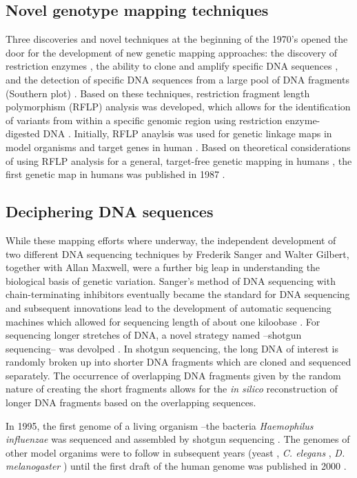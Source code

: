 \subsection{Novel genotype mapping techniques}
Three discoveries and novel techniques at the beginning of the 1970's opened the door for the development of new genetic mapping approaches: the discovery of restriction enzymes \citep{Smith1970,Morrow1972}, the ability to clone and amplify specific DNA sequences \citep{Jackson1972,Cohen1973}, and the detection of specific DNA sequences from a large pool of DNA fragments (Southern plot) \citep{Southern1975}. Based on these techniques, restriction fragment length polymorphism (RFLP) analysis was developed, which allows for the identification of variants from within a specific genomic region using restriction enzyme-digested DNA \citep{Grodzicker1974,Botstein1980}. Initially, RFLP anaylsis was used for genetic linkage maps in model organisms \citep{Goodman1977,Cameron1979} and target genes in human  \citep{Kan1978,Jeffreys1979,Tuan1979}.  Based on theoretical considerations of using RFLP analysis for a general, target-free genetic mapping in humans \citep{Botstein1980}, the first genetic map in humans was published in 1987 \citep{Donis-Keller1987}. 

\subsection{Deciphering DNA sequences}
While these mapping efforts where underway, the independent development of two different DNA sequencing techniques by Frederik Sanger and Walter Gilbert, together with Allan Maxwell, were a further big leap in understanding the biological basis of genetic variation. Sanger's method of DNA sequencing with chain-terminating inhibitors eventually became the standard for DNA sequencing and subsequent innovations lead to the development of automatic sequencing machines which allowed for sequencing length of about one kiloobase \citep{Hunkapiller1991}. For sequencing longer stretches of DNA, a novel strategy named  --shotgun sequencing-- was devolped \citep{Staden1979,Anderson1981}. In shotgun sequencing, the long DNA of interest is randomly broken up into shorter DNA fragments which are cloned and sequenced separately. The occurrence of overlapping DNA fragments given by the random nature of creating the short fragments allows for the \textit{in silico} reconstruction of longer DNA fragments based on the overlapping sequences. 

In 1995, the first genome of a living organism --the bacteria \textit{Haemophilus influenzae} was sequenced and assembled by shotgun sequencing \citep{Fleischmann1995}. The genomes of other model organims were to follow in subsequent years (yeast \citep{Goffeau1996}, \textit{C. elegans} \citep{C.elegans1998}, \textit{D. melanogaster} \citep{Adams2000}) until the first draft of the human genome was published in 2000 \citep{Lander2000}. 


